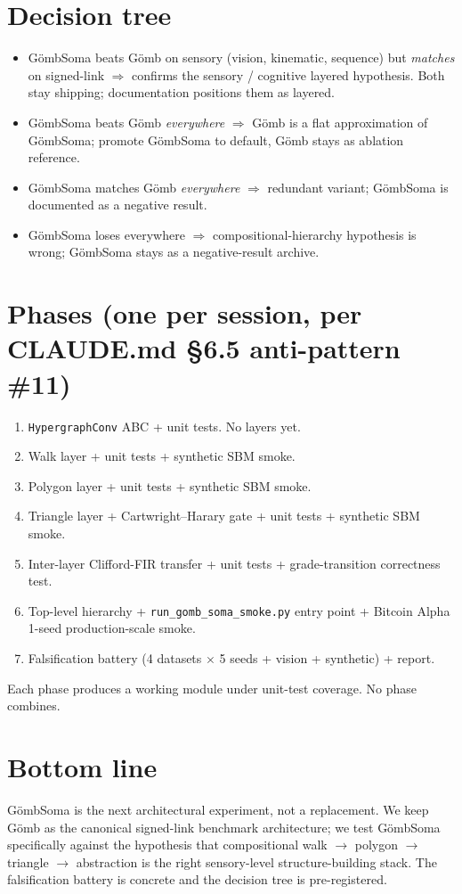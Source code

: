 \documentclass[11pt,a4paper]{article}
\newcommand{\Gomb}{G\"omb}
\newcommand{\Soma}{G\"ombSoma}
\begin{document}
\section{Decision tree}

\begin{itemize}
\item \Soma{} beats \Gomb{} on sensory (vision, kinematic, sequence) but \emph{matches} on signed-link $\Rightarrow$ confirms the sensory / cognitive layered hypothesis. Both stay shipping; documentation positions them as layered.
\item \Soma{} beats \Gomb{} \emph{everywhere} $\Rightarrow$ \Gomb{} is a flat approximation of \Soma; promote \Soma{} to default, \Gomb{} stays as ablation reference.
\item \Soma{} matches \Gomb{} \emph{everywhere} $\Rightarrow$ redundant variant; \Soma{} is documented as a negative result.
\item \Soma{} loses everywhere $\Rightarrow$ compositional-hierarchy hypothesis is wrong; \Soma{} stays as a negative-result archive.
\end{itemize}

\section{Phases (one per session, per CLAUDE.md §6.5 anti-pattern \#11)}

\begin{enumerate}
\item \texttt{HypergraphConv} ABC + unit tests. No layers yet.
\item Walk layer + unit tests + synthetic SBM smoke.
\item Polygon layer + unit tests + synthetic SBM smoke.
\item Triangle layer + Cartwright--Harary gate + unit tests + synthetic SBM smoke.
\item Inter-layer Clifford-FIR transfer + unit tests + grade-transition correctness test.
\item Top-level hierarchy + \texttt{run\_gomb\_soma\_smoke.py} entry point + Bitcoin Alpha 1-seed production-scale smoke.
\item Falsification battery (4 datasets $\times$ 5 seeds + vision + synthetic) + report.
\end{enumerate}

Each phase produces a working module under unit-test coverage. No phase combines.

\section{Bottom line}

\Soma{} is the next architectural experiment, not a replacement. We
keep \Gomb{} as the canonical signed-link benchmark architecture; we
test \Soma{} specifically against the hypothesis that compositional
walk $\to$ polygon $\to$ triangle $\to$ abstraction is the right
sensory-level structure-building stack. The falsification battery
is concrete and the decision tree is pre-registered.
\end{document}
